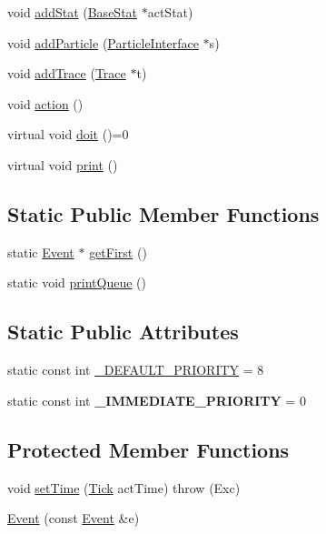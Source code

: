 \begin{DoxyCompactItemize}
\item 
void \hyperlink{classMetaSim_1_1Event_a03151f618312378f65fe0b96a63dc4c9}{add\+Stat} (\hyperlink{classMetaSim_1_1BaseStat}{Base\+Stat} $\ast$act\+Stat)
\item 
void \hyperlink{classMetaSim_1_1Event_a5097d35dd8ef7d6b1485cdd12d1bbb4e}{add\+Particle} (\hyperlink{classMetaSim_1_1ParticleInterface}{Particle\+Interface} $\ast$s)
\item 
void \hyperlink{classMetaSim_1_1Event_a66807c7d220a17e1d1662110a6c968ab}{add\+Trace} (\hyperlink{classMetaSim_1_1Trace}{Trace} $\ast$t)
\item 
void \hyperlink{classMetaSim_1_1Event_afdad9f12b7b4632903902cc83f877333}{action} ()
\item 
virtual void \hyperlink{classMetaSim_1_1Event_ac9621898eb5775271ca3e0197c27674a}{doit} ()=0
\item 
virtual void \hyperlink{classMetaSim_1_1Event_ab0535c5bd6c98a7ffd26474a26065752}{print} ()
\end{DoxyCompactItemize}
\subsection*{Static Public Member Functions}
\begin{DoxyCompactItemize}
\item 
static \hyperlink{classMetaSim_1_1Event}{Event} $\ast$ \hyperlink{classMetaSim_1_1Event_ac73548bf18f2946b6856e539f0afbfd0}{get\+First} ()
\item 
static void \hyperlink{classMetaSim_1_1Event_a1ea1abdb4ff60e7ad3f7ac10fa47f953}{print\+Queue} ()
\end{DoxyCompactItemize}
\subsection*{Static Public Attributes}
\begin{DoxyCompactItemize}
\item 
static const int \hyperlink{classMetaSim_1_1Event_a93a8a4b3c1db0fdd2fadd7345f0b8c42}{\+\_\+\+D\+E\+F\+A\+U\+L\+T\+\_\+\+P\+R\+I\+O\+R\+I\+TY} = 8
\item 
static const int {\bfseries \+\_\+\+I\+M\+M\+E\+D\+I\+A\+T\+E\+\_\+\+P\+R\+I\+O\+R\+I\+TY} = 0\hypertarget{classMetaSim_1_1Event_a8b7c02ea65ac1cd53708fde32d603cc7}{}\label{classMetaSim_1_1Event_a8b7c02ea65ac1cd53708fde32d603cc7}

\end{DoxyCompactItemize}
\subsection*{Protected Member Functions}
\begin{DoxyCompactItemize}
\item 
void \hyperlink{classMetaSim_1_1Event_a15934fcf88a1452b69c6300c2c580c3e}{set\+Time} (\hyperlink{classMetaSim_1_1Tick}{Tick} act\+Time)  throw (\+Exc)
\item 
\hyperlink{classMetaSim_1_1Event_ace1433aed54a96f817be09e95fddd10d}{Event} (const \hyperlink{classMetaSim_1_1Event}{Event} \&e)
\end{DoxyCompactItemize}
